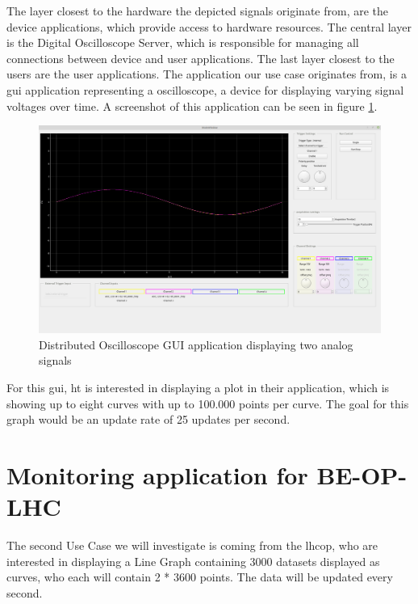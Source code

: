 The layer closest to the hardware the depicted signals originate from, are the
device applications, which provide access to hardware resources. The central
layer is the Digital Oscilloscope Server, which is responsible for managing all
connections between device and user applications. The last layer closest to the
users are the user applications. The application our use case originates from,
is a \gls{gui} application representing a oscilloscope, a device for displaying
varying signal voltages over time. A screenshot of this application can be seen
in figure \ref{fig:dogui}.
\cite{DistrOscDocs, BeCoHtSection}

\begin{figure}[h]
    \centering
    \includegraphics[width=15cm]{resources/img/DistributedOscilloscope}
    \caption{
        Distributed Oscilloscope GUI application displaying two analog signals
    }
    \label{fig:dogui}
\end{figure}

For this \gls{gui}, \gls{ht} is interested in displaying a plot in their
application, which is showing up to eight curves with up to 100.000 points per
curve. The goal for this graph would be an update rate of 25 updates per second.


\section{Monitoring application for BE-OP-LHC}
\label{sec:usecases:becolhc}

The second Use Case we will investigate is coming from the \gls{lhcop}, who are
interested in displaying a Line Graph containing 3000 datasets displayed as
curves, who each will contain 2 * 3600 points. The data will be updated every
second.


